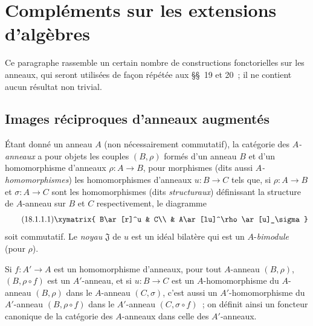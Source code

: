 \section{Compléments sur les extensions d'algèbres}
\label{section:0.18-fr}

Ce paragraphe rassemble un certain nombre de constructions fonctorielles sur
les anneaux, qui seront utilisées de façon répétée aux \S\S~19 et 20~; il ne
contient aucun résultat non trivial.

\subsection{Images réciproques d'anneaux augmentés}
\label{subsection:0.18.1-fr}

\begin{env}[18.1.1]
\label{0.18.1.1-fr}
Étant donné un anneau $A$ (non nécessairement commutatif), la catégorie des
\emph{$A$-anneaux} a pour objets les couples $(B,\rho)$ formés d'un anneau
$B$ et d'un homomorphisme d'anneaux $\rho:A\to B$, pour morphismes (dits aussi
\emph{$A$-homomorphismes}) les homomorphismes d'anneaux $u:B\to C$ tels que,
si $\rho:A\to B$ et $\sigma:A\to C$ sont les homomorphismes (dits
\emph{structuraux}) définissant la structure de $A$-anneau sur $B$ et $C$
respectivement, le diagramme
\begin{equation}
\label{0.18.1.1.1-fr}
\tag{18.1.1.1}
  \xymatrix{
    B\ar[r]^u & C\\
    & A\ar[lu]^\rho\ar[u]_\sigma
  }
\end{equation}
soit commutatif. Le \emph{noyau} $\mathfrak{J}$ de $u$ est un idéal bilatère
qui est un $A$-\emph{bimodule} (pour $\rho$).

Si $f:A'\to A$ est un homomorphisme d'anneaux, pour tout $A$-anneau
$(B,\rho)$, $(B,\rho\circ f)$ est un $A'$-anneau, et si $u:B\to C$ est un
$A$-homomorphisme du $A$-anneau $(B,\rho)$
dans le $A$-anneau $(C,\sigma)$, c'est aussi un $A'$-homomorphisme du
$A'$-anneau $(B,\rho\circ f)$ dans le $A'$-anneau $(C,\sigma\circ f)$~; on
définit ainsi un foncteur canonique de la catégorie des $A$-anneaux dans celle
des $A'$-anneaux.
\end{env}

